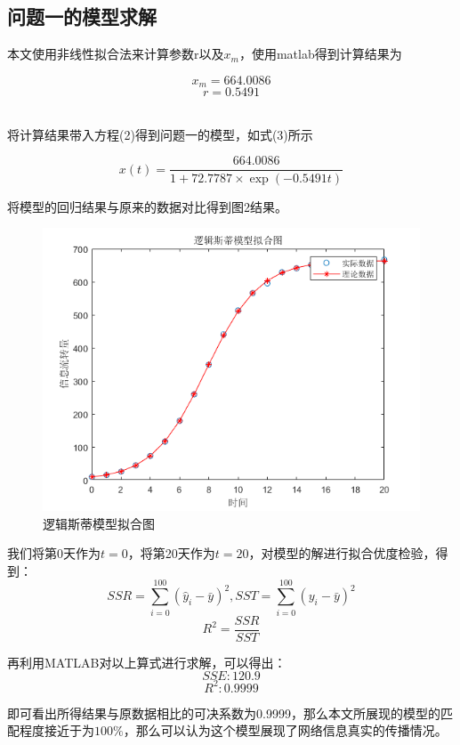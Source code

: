 \documentclass[UTF8]{ctexart}
\begin{document}
\subsection{问题一的模型求解}
本文使用非线性拟合法来计算参数r以及$x_m$，使用matlab得到计算结果为\par
$$
x_m=664.0086
$$
$$
r=0.5491
$$​\par
将计算结果带入方程(2)得到问题一的模型，如式(3)所示\par
\begin{equation}
	x\left( t \right) =\frac{664.0086}{1+72.7787\times \exp \left( -0.5491t \right)}
\end{equation}\par
将模型的回归结果与原来的数据对比得到图2结果。\par
\begin{figure}[h]
	\centering
	\includegraphics[scale=1]{逻辑斯蒂模型拟合图.png}
	\caption{逻辑斯蒂模型拟合图}
\end{figure}\par
我们将第0天作为$t=0$，将第20天作为$t=20$，对模型的解进行拟合优度检验，得到：
$$
SSR=\sum_{i=0}^{100}{\left( \hat{y}_i-\bar{y} \right) ^2},SST=\sum_{i=0}^{100}{\left( y_i-\bar{y} \right) ^2}
$$
$$
R^2=\frac{SSR}{SST}
$$\par
再利用MATLAB对以上算式进行求解，可以得出：
$$
SSE:120.9
$$
$$
R^2:0.9999
$$\par
即可看出所得结果与原数据相比的可决系数为0.9999，那么本文所展现的模型的匹配程度接近于为$100\%$，那么可以认为这个模型展现了网络信息真实的传播情况。
\end{document}
